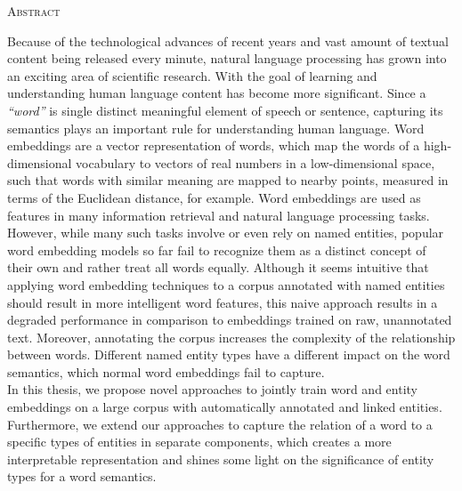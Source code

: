 \begin{center}
  \textsc{Abstract}
\end{center}
%
\noindent
%
Because of the technological advances of recent years and vast amount of textual content being released every minute, natural language processing has grown into an exciting area of scientific research. With the goal of learning and understanding human language content has become more significant.
Since a \emph{``word''} is single distinct meaningful element of speech or sentence, capturing its semantics plays an important rule for understanding human language.
Word embeddings are a vector representation of words, which map the words of a high-dimensional vocabulary to vectors of real numbers in a low-dimensional space, such that words with similar meaning are mapped to nearby points, measured in terms of the Euclidean distance, for example.
Word embeddings are used as features in many information retrieval and natural language processing tasks. However, while many such tasks involve or even rely on named entities, popular word embedding models so far fail to recognize them as a distinct concept of their own and rather treat all words equally.
Although it seems intuitive that applying word embedding techniques to a corpus annotated with named entities should result in more intelligent word features, this naive approach results in a degraded performance in comparison to embeddings trained on raw, unannotated text.
Moreover, annotating the corpus increases the complexity of the relationship between words. Different named entity types have a different impact on the word semantics, which normal word embeddings fail to capture.
\\
In this thesis, we propose novel approaches to jointly train word and entity embeddings on a large corpus with automatically annotated and linked entities.
Furthermore, we extend our approaches to capture the relation of a word to a specific types of entities in separate components, which creates a more interpretable representation and shines some light on the significance of entity types for a word semantics.

